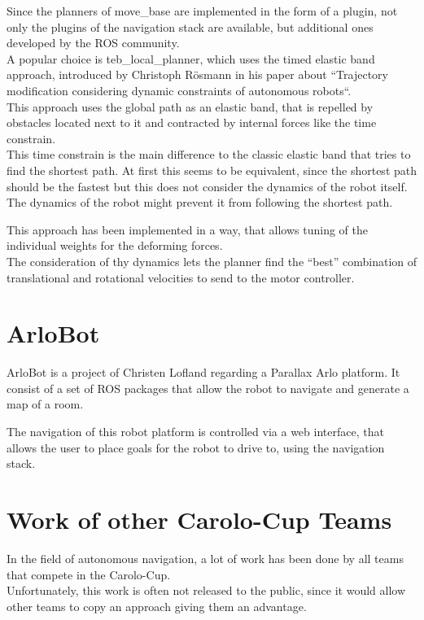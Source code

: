 Since the planners of move\_base are implemented in the form of a plugin, not only the plugins of the navigation stack are available, but additional ones developed by the ROS community.\\

A popular choice is teb\_local\_planner, which uses the timed elastic band approach, introduced by Christoph Rösmann in his paper about ``Trajectory modification considering dynamic constraints of autonomous robots``.\\
This approach uses the global path as an elastic band, that is repelled by obstacles located next to it and contracted by internal forces like the time constrain.\\
This time constrain is the main difference to the classic elastic band that tries to find the shortest path. At first this seems to be equivalent, since the shortest path should be the fastest but this does not consider the dynamics of the robot itself. 
The dynamics of the robot might prevent it from following the shortest path\cite{Rsmann2012TrajectoryMC}. 

This approach has been implemented in a way, that allows tuning of the individual weights for the deforming forces.\\

The consideration of thy dynamics lets the planner find the ``best'' combination of translational and rotational velocities to send to the motor controller.


\section{ArloBot}
ArloBot is a project of Christen Lofland regarding a Parallax Arlo platform. It consist of a set of ROS packages that allow the robot to navigate and generate a map of a room\cite{chrisl8}.

The navigation of this robot platform is controlled via a web interface, that allows the user to place goals for the robot to drive to, using the navigation stack.

\section{Work of other Carolo-Cup Teams}
In the field of autonomous navigation, a lot of work has been done by all teams that compete in the Carolo-Cup.\\

Unfortunately, this work is often not released to the public, since it would allow other teams to copy an approach giving them an advantage.\\

